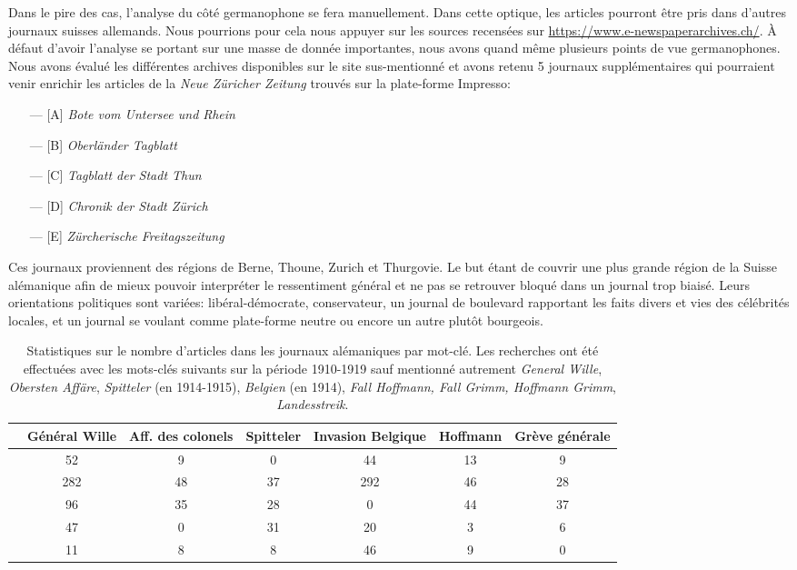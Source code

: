 \documentclass[french,a4paper]{article}
\begin{document}
Dans le pire des cas, l'analyse du côté germanophone se fera manuellement.
Dans cette optique, les articles pourront être pris dans d'autres journaux suisses allemands.
Nous pourrions pour cela nous appuyer sur les sources recensées sur \url{https://www.e-newspaperarchives.ch/}.
À défaut d'avoir l'analyse se portant sur une masse de donnée importantes, nous avons quand même plusieurs points de vue germanophones.
Nous avons évalué les différentes archives disponibles sur le site sus-mentionné et avons retenu 5 journaux supplémentaires qui pourraient venir enrichir les articles de la \textit{Neue Züricher Zeitung} trouvés sur la plate-forme Impresso:

\begin{itemize}
    \item[---] [A] \textit{Bote vom Untersee und Rhein}
    \item[---] [B] \textit{Oberländer Tagblatt}
    \item[---] [C] \textit{Tagblatt der Stadt Thun}
    \item[---] [D] \textit{Chronik der Stadt Zürich}
    \item[---] [E] \textit{Zürcherische Freitagszeitung}
\end{itemize}

Ces journaux proviennent des régions de Berne, Thoune, Zurich et Thurgovie.
Le but étant de couvrir une plus grande région de la Suisse alémanique afin de mieux pouvoir interpréter le ressentiment général et ne pas se retrouver bloqué dans un journal trop biaisé.
Leurs orientations politiques sont variées: libéral-démocrate, conservateur, un journal de boulevard rapportant les faits divers et vies des célébrités locales, et un journal se voulant comme plate-forme neutre ou encore un autre plutôt bourgeois.

\begin{table}[h!]
\begin{tabular}{|c|c|c|c|c|c|c|}
\hline
 & Général Wille & Aff. des colonels &  Spitteler & Invasion Belgique &  Hoffmann & Grève générale \\
\hline\hline
 [A] & 52 & 9 & 0 & 44 & 13 & 9\\
\hline
 [B] & 282 & 48 & 37 & 292 & 46 & 28\\
\hline
 [C] & 96 & 35 & 28 & 0 & 44 & 37\\
\hline
 [D] & 47 & 0 & 31 & 20 & 3 & 6 \\
\hline
 [E] & 11 & 8 & 8 & 46 & 9 & 0 \\
\hline
\end{tabular}
\centering
\caption{
Statistiques sur le nombre d'articles dans les journaux alémaniques par mot-clé.
Les recherches ont été effectuées avec les mots-clés suivants sur la période 1910-1919 sauf mentionné autrement \textit{General Wille}, \textit{Obersten Affäre}, \textit{Spitteler} (en 1914-1915), \textit{Belgien} (en 1914), \textit{Fall Hoffmann, Fall Grimm, Hoffmann Grimm}, \textit{Landesstreik}.
}
\end{table}
\end{document}
